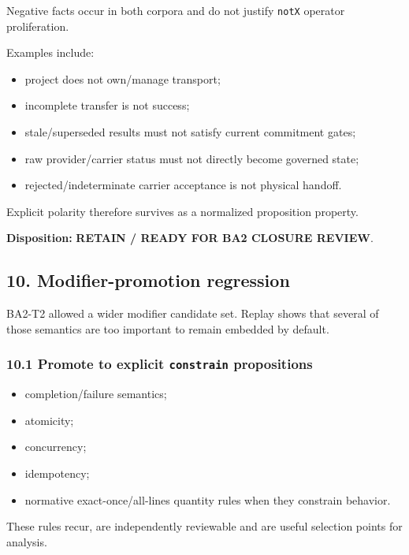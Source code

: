 \documentclass[
  10pt,
  a4paper,
]{article}
\providecommand{\tightlist}{%
  \setlength{\itemsep}{0pt}\setlength{\parskip}{0pt}}
\begin{document}
Negative facts occur in both corpora and do not justify \texttt{notX}
operator proliferation.

Examples include:

\begin{itemize}
\tightlist
\item
  project does not own/manage transport;
\item
  incomplete transfer is not success;
\item
  stale/superseded results must not satisfy current commitment gates;
\item
  raw provider/carrier status must not directly become governed state;
\item
  rejected/indeterminate carrier acceptance is not physical handoff.
\end{itemize}

Explicit polarity therefore survives as a normalized proposition
property.

\textbf{Disposition:} \textbf{RETAIN / READY FOR BA2 CLOSURE REVIEW}.

\subsection{10. Modifier-promotion
regression}\label{10-modifier-promotion-regression}

BA2-T2 allowed a wider modifier candidate set. Replay shows that several
of those semantics are too important to remain embedded by default.

\subsubsection{\texorpdfstring{10.1 Promote to explicit
\texttt{constrain}
propositions}{10.1 Promote to explicit constrain propositions}}\label{101-promote-to-explicit-constrain-propositions}

\begin{itemize}
\tightlist
\item
  completion/failure semantics;
\item
  atomicity;
\item
  concurrency;
\item
  idempotency;
\item
  normative exact-once/all-lines quantity rules when they constrain
  behavior.
\end{itemize}

These rules recur, are independently reviewable and are useful selection
points for analysis.
\end{document}
